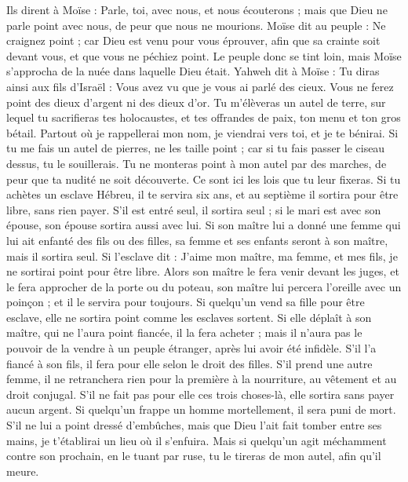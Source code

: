 \begin{multicols}{2}
Ils dirent à Moïse : Parle, toi, avec nous, et nous écouterons ; mais que Dieu ne parle point avec nous, de peur que nous ne mourions\FTNT{}.
Moïse dit au peuple : Ne craignez point ; car Dieu est venu pour vous éprouver, afin que sa crainte soit devant vous, et que vous ne péchiez point.
Le peuple donc se tint loin, mais Moïse s'approcha de la nuée dans laquelle Dieu était.
Yahweh dit à Moïse : Tu diras ainsi aux fils d'Israël : Vous avez vu que je vous ai parlé des cieux.
Vous ne ferez point des dieux d'argent ni des dieux d'or.
Tu m’élèveras un autel de terre, sur lequel tu sacrifieras tes holocaustes, et tes offrandes de paix, ton menu et ton gros bétail. Partout où je rappellerai mon nom, je viendrai vers toi, et je te bénirai.
Si tu me fais un autel de pierres, ne les taille point ; car si tu fais passer le ciseau dessus, tu le souillerais.
Tu ne monteras point à mon autel par des marches, de peur que ta nudité ne soit découverte.
\VerseOne{}Ce sont ici les lois que tu leur fixeras.
Si tu achètes un esclave Hébreu, il te servira six ans, et au septième il sortira pour être libre, sans rien payer\FTNT{}.
S'il est entré seul, il sortira seul ; si le mari est avec son épouse, son épouse sortira aussi avec lui.
Si son maître lui a donné une femme qui lui ait enfanté des fils ou des filles, sa femme et ses enfants seront à son maître, mais il sortira seul.
Si l'esclave dit : J'aime mon maître, ma femme, et mes fils, je ne sortirai point pour être libre.
Alors son maître le fera venir devant les juges, et le fera approcher de la porte ou du poteau, son maître lui percera l'oreille avec un poinçon ; et il le servira pour toujours.
Si quelqu'un vend sa fille pour être esclave, elle ne sortira point comme les esclaves sortent.
Si elle déplaît à son maître, qui ne l'aura point fiancée, il la fera acheter ; mais il n'aura pas le pouvoir de la vendre à un peuple étranger, après lui avoir été infidèle.
S'il l'a fiancé à son fils, il fera pour elle selon le droit des filles.
S’il prend une autre femme, il ne retranchera rien pour la première à la nourriture, au vêtement et au droit conjugal.
S'il ne fait pas pour elle ces trois choses-là, elle sortira sans payer aucun argent.
Si quelqu'un frappe un homme mortellement, il sera puni de mort\FTNT{}.
S'il ne lui a point dressé d'embûches, mais que Dieu l'ait fait tomber entre ses mains, je t'établirai un lieu où il s'enfuira.
Mais si quelqu'un agit méchamment contre son prochain, en le tuant par ruse, tu le tireras de mon autel, afin qu'il meure.

\end{multicols}
